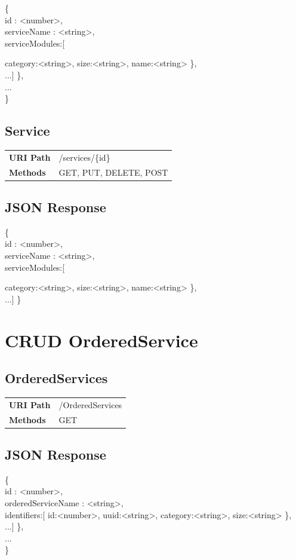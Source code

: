 \documentclass[11pt]{scrartcl}
\begin{document}
\{\\
id : <number>,\\
serviceName : <string>,\\
serviceModules:[{
category:<string>,
size:<string>,
name:<string>
\}, \\ 
...]
\},\\
...\\
\}\\

\subsection{Service}


\begin{tabularx}{\linewidth}{l l}
\textbf{URI Path} & /services/\{id\}\\
\textbf{Methods} & GET, PUT, DELETE, POST\\
\end{tabularx}

\subsection{JSON Response}
\{\\
id : <number>,\\
serviceName : <string>,\\
serviceModules:[{
category:<string>,
size:<string>,
name:<string>
\}, \\ 
...]
\}

\section{CRUD OrderedService}
\subsection{OrderedServices}
\begin{tabularx}{\linewidth}{l l}
\textbf{URI Path} & /OrderedServices\\
\textbf{Methods} & GET\\
\end{tabularx}

\subsection{JSON Response}
\{\\
id : <number>,\\
orderedServiceName : <string>,\\
identifiers:[{
id:<number>,
uuid:<string>,
category:<string>,
size:<string>
\}, \\ 
...]
\},\\
...\\
\}\\


}}}
\end{document}

